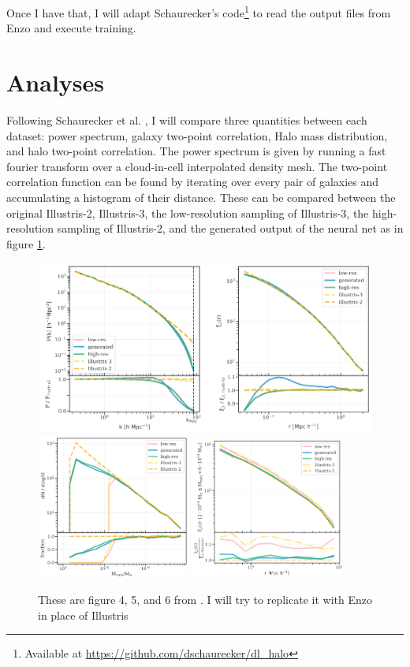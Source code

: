 Once I have that, I will adapt Schaurecker's code\footnote{Available at \url{https://github.com/dschaurecker/dl_halo}} to read the output files from Enzo and execute training.

\section*{Analyses}

Following Schaurecker et al. \cite{superresolving-halos}, I will compare three quantities between each dataset: power spectrum, galaxy two-point correlation, Halo mass distribution, and halo two-point correlation. The power spectrum is given by running a fast fourier transform over a cloud-in-cell interpolated density mesh. The two-point correlation function can be found by iterating over every pair of galaxies and accumulating a histogram of their distance. These can be compared between the original Illustris-2, Illustris-3, the low-resolution sampling of Illustris-3, the high-resolution sampling of Illustris-2, and the generated output of the neural net as in figure \cref{Illustris-fig}.

\begin{figure}[h]
  \includegraphics[width=\textwidth]{power-spectrum.png}
  \includegraphics[width=0.45\textwidth]{halo-mass.png}
  \includegraphics[width=0.45\textwidth]{halo-correlation.png}
  \caption{These are figure 4, 5, and 6 from \cite{superresolving-halos}. I will try to replicate it with Enzo in place of Illustris}
  \label{Illustris-fig}
\end{figure}
